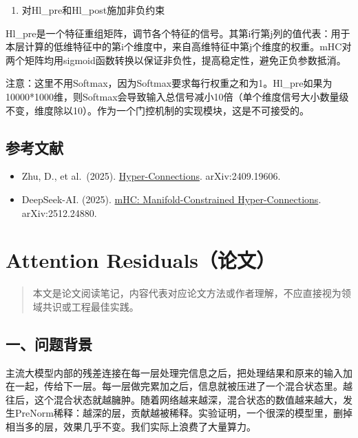\begin{enumerate}
\def\labelenumi{\arabic{enumi}.}
\setcounter{enumi}{1}
\tightlist
\item
  对Hl\_pre和Hl\_post施加非负约束
\end{enumerate}

Hl\_pre是一个特征重组矩阵，调节各个特征的信号。其第i行第j列的值代表：用于本层计算的低维特征中的第i个维度中，来自高维特征中第j个维度的权重。mHC对两个矩阵均用sigmoid函数转换以保证非负性，提高稳定性，避免正负参数抵消。

注意：这里不用Softmax，因为Softmax要求每行权重之和为1。Hl\_pre如果为10000*1000维，则Softmax会导致输入总信号减小10倍（单个维度信号大小数量级不变，维度除以10）。作为一个门控机制的实现模块，这是不可接受的。

\hypertarget{ux53c2ux8003ux6587ux732e-101}{%
\subsection{参考文献}\label{ux53c2ux8003ux6587ux732e-101}}

\begin{itemize}
\tightlist
\item
  Zhu, D., et al.~(2025). \href{https://arxiv.org/abs/2409.19606}{Hyper-Connections}. arXiv:2409.19606.
\item
  DeepSeek-AI. (2025). \href{https://arxiv.org/abs/2512.24880}{mHC: Manifold-Constrained Hyper-Connections}. arXiv:2512.24880.
\end{itemize}

\clearpage

\hypertarget{attention-residualsux8bbaux6587}{%
\section{Attention Residuals（论文）}\label{attention-residualsux8bbaux6587}}

\begin{quote}
本文是论文阅读笔记，内容代表对应论文方法或作者理解，不应直接视为领域共识或工程最佳实践。
\end{quote}

\hypertarget{ux4e00ux95eeux9898ux80ccux666f-1}{%
\subsection{一、问题背景}\label{ux4e00ux95eeux9898ux80ccux666f-1}}

主流大模型内部的残差连接在每一层处理完信息之后，把处理结果和原来的输入加在一起，传给下一层。每一层做完累加之后，信息就被压进了一个混合状态里。越往后，这个混合状态就越臃肿。随着网络越来越深，混合状态的数值越来越大，发生PreNorm稀释：越深的层，贡献越被稀释。实验证明，一个很深的模型里，删掉相当多的层，效果几乎不变。我们实际上浪费了大量算力。

